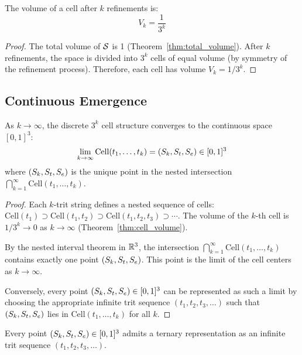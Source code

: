 \begin{theorem}
\label{thm:cell_volume}
The volume of a cell after $k$ refinements is:
\begin{equation}
V_k = \frac{1}{3^k}
\label{eq:cell_volume}
\end{equation}
\end{theorem}

\begin{proof}
The total volume of $\mathcal{S}$ is 1 (Theorem~\ref{thm:total_volume}). After $k$ refinements, the space is divided into $3^k$ cells of equal volume (by symmetry of the refinement process). Therefore, each cell has volume $V_k = 1/3^k$.
\end{proof}

\subsection{Continuous Emergence}

\begin{theorem}
\label{thm:continuous_emergence}
As $k \to \infty$, the discrete $3^k$ cell structure converges to the continuous space $[0,1]^3$:
\begin{equation}
\lim_{k \to \infty} \text{Cell}(t_1,\ldots,t_k) = (S_k,S_t,S_e) \in [0,1]^3
\label{eq:continuous_emergence}
\end{equation}
where $(S_k,S_t,S_e)$ is the unique point in the nested intersection $\bigcap_{k=1}^\infty \text{Cell}(t_1,\ldots,t_k)$.
\end{theorem}

\begin{proof}
Each $k$-trit string defines a nested sequence of cells: $\text{Cell}(t_1) \supset \text{Cell}(t_1,t_2) \supset \text{Cell}(t_1,t_2,t_3) \supset \cdots$. The volume of the $k$-th cell is $1/3^k \to 0$ as $k \to \infty$ (Theorem~\ref{thm:cell_volume}).

By the nested interval theorem in $\mathbb{R}^3$, the intersection $\bigcap_{k=1}^\infty \text{Cell}(t_1,\ldots,t_k)$ contains exactly one point $(S_k,S_t,S_e)$. This point is the limit of the cell centers as $k \to \infty$.

Conversely, every point $(S_k,S_t,S_e) \in [0,1]^3$ can be represented as such a limit by choosing the appropriate infinite trit sequence $(t_1,t_2,t_3,\ldots)$ such that $(S_k,S_t,S_e)$ lies in $\text{Cell}(t_1,\ldots,t_k)$ for all $k$.
\end{proof}

\begin{corollary}
\label{cor:ternary_representation}
Every point $(S_k,S_t,S_e) \in [0,1]^3$ admits a ternary representation as an infinite trit sequence $(t_1,t_2,t_3,\ldots)$.
\end{corollary}

